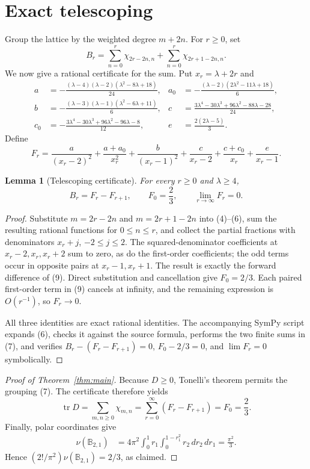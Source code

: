 \documentclass[11pt]{article}
\newtheorem{lemma}[theorem]{Lemma}
\newcommand{\tr}{\operatorname{tr}}
\begin{document}
\section{Exact telescoping}

Group the lattice by the weighted degree $m+2n$.  For $r\ge0$, set
\[
 B_r=\sum_{n=0}^{r}\chi_{2r-2n,n}
     +\sum_{n=0}^{r}\chi_{2r+1-2n,n}.
 \tag{7}
\]
We now give a rational certificate for the sum.  Put $x_r=\lambda+2r$ and
\[
\begin{aligned}
a&=-\frac{(\lambda-4)(\lambda-2)(\lambda^2-8\lambda+18)}{24},&
a_0&=-\frac{(\lambda-2)(2\lambda^2-11\lambda+18)}6,\\
b&=-\frac{(\lambda-3)(\lambda-1)(\lambda^2-6\lambda+11)}6,&
c&=\frac{3\lambda^4-30\lambda^3+96\lambda^2-88\lambda-28}{24},\\
c_0&=-\frac{3\lambda^4-30\lambda^3+96\lambda^2-96\lambda-8}{12},&
e&=\frac{2(2\lambda-5)}3.
\end{aligned}
\tag{8}
\]
Define
\[
 F_r=\frac a{(x_r-2)^2}+\frac{a+a_0}{x_r^2}
 +\frac b{(x_r-1)^2}+\frac c{x_r-2}
 +\frac{c+c_0}{x_r}+\frac e{x_r-1}.
 \tag{9}
\]

\begin{lemma}[Telescoping certificate]
For every $r\ge0$ and $\lambda\ge4$,
\[
 B_r=F_r-F_{r+1},\qquad F_0=\frac23,\qquad \lim_{r\to\infty}F_r=0.
\]
\end{lemma}

\begin{proof}
Substitute $m=2r-2n$ and $m=2r+1-2n$ into (4)--(6), sum the resulting
rational functions for $0\le n\le r$, and collect the partial fractions with
denominators $x_r+j$, $-2\le j\le2$.  The squared-denominator coefficients at
$x_r-2,x_r,x_r+2$ sum to zero, as do the first-order coefficients; the odd
terms occur in opposite pairs at $x_r-1,x_r+1$.  The result is exactly the
forward difference of (9).  Direct substitution and cancellation give
$F_0=2/3$.  Each paired first-order term in (9) cancels at infinity, and the
remaining expression is $O(r^{-1})$, so $F_r\to0$.

All three identities are exact rational identities.  The accompanying SymPy
script expands (6), checks it against the source formula, performs the two
finite sums in (7), and verifies
$B_r-(F_r-F_{r+1})=0$, $F_0-2/3=0$, and $\lim F_r=0$ symbolically.
\end{proof}

\begin{proof}[Proof of Theorem~\ref{thm:main}]
Because $D\ge0$, Tonelli's theorem permits the grouping (7).  The certificate
therefore yields
\[
 \tr D=\sum_{m,n\ge0}\chi_{m,n}
 =\sum_{r=0}^{\infty}(F_r-F_{r+1})=F_0=\frac23.
\]
Finally, polar coordinates give
\[
\begin{aligned}
\nu(\mathbb B_{2,1})
&=4\pi^2\int_0^1 r_1
   \int_0^{1-r_1^2}r_2\,dr_2\,dr_1
=\frac{\pi^2}{3}.
\end{aligned}
\]
Hence $(2!/\pi^2)\nu(\mathbb B_{2,1})=2/3$, as claimed.
\end{proof}
\end{document}
